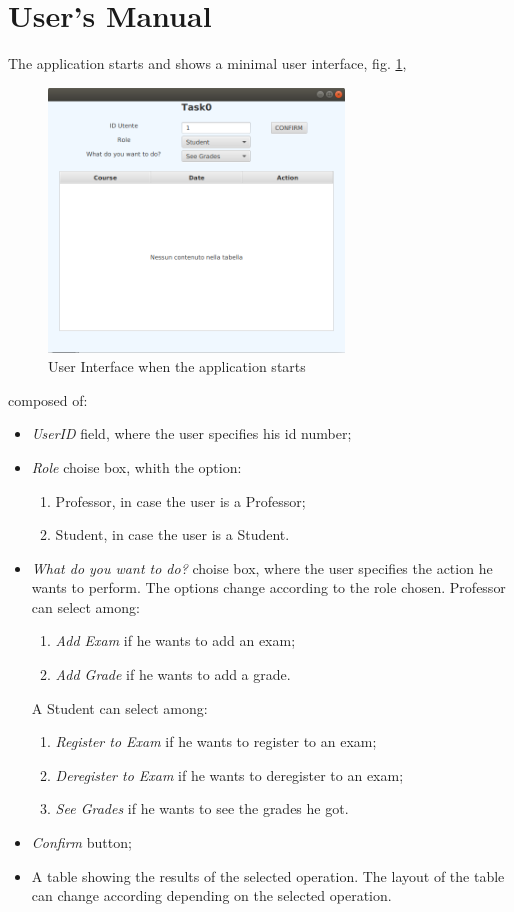 \documentclass{report}
\begin{document}
\chapter*{User's Manual}
The application starts and shows a minimal user interface, fig. \ref{fig:UIStart},
\begin{figure}[h!]
	\centering
	\includegraphics[width=0.7\textwidth]{UIStart.png}
	\caption{User Interface when the application starts}
	\label{fig:UIStart}
\end{figure}
composed of:
\begin{itemize}
	\item \textit{UserID} field, where the user specifies his id number;
	\item \textit{Role} choise box, whith the option:
	\begin{enumerate}
		\item Professor, in case the user is a Professor;
		\item Student, in case the user is a Student.
	\end{enumerate} 
	\item \textit{What do you want to do?} choise box, where the user specifies the action he wants to perform. The options change according to the role chosen.
	Professor can select among:
	\begin{enumerate}
		\item \textit{Add Exam} if he wants to add an exam;
		\item \textit{Add Grade} if he wants to add a grade.
	\end{enumerate}
	A Student can select among:
	\begin{enumerate}
		\item \textit{Register to Exam} if he wants to register to an exam;
		\item \textit{Deregister to Exam} if he wants to deregister to an exam;
		\item \textit{See Grades} if he wants to see the grades he got.
	\end{enumerate}
	\item \textit{Confirm} button;
	\item A table showing the results of the selected operation. The layout of the table can change according depending on the selected operation.
\end{itemize}
\end{document}
